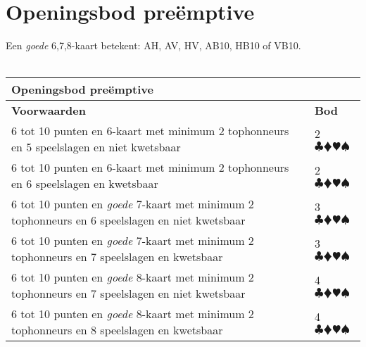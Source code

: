 \documentclass[12pt,a4paper]{report}
\begin{document}
\section{Openingsbod pre\"emptive}

Een \emph{goede} 6,7,8-kaart betekent: AH, AV, HV, AB10, HB10 of VB10.
\\ \  

\begin{tabular}{|p{8cm}|l|}
	\hline 
	\textbf{Openingsbod pre\"emptive} & \\
	\hline 
	\textbf{Voorwaarden}  &\textbf{Bod} \\ 
	\hline 
	
	6 tot 10 punten \newline 
	en 6-kaart met minimum 2 tophonneurs \newline 
	en 5 speelslagen \newline 
	en niet kwetsbaar 
	   & 2  $\clubsuit \vardiamondsuit \varheartsuit \spadesuit$ \\ 
	\hline
	
	6 tot 10 punten \newline 
	en 6-kaart met minimum 2 tophonneurs \newline 
	en 6 speelslagen \newline 
	en  kwetsbaar 
	   & 2  $\clubsuit \vardiamondsuit \varheartsuit \spadesuit$ \\  
	\hline
		
	6 tot 10 punten \newline 
	en \emph{goede} 7-kaart met minimum 2 tophonneurs \newline 
	en 6 speelslagen \newline 
	en  niet kwetsbaar  
	   & 3  $\clubsuit \vardiamondsuit \varheartsuit \spadesuit$ \\  
	\hline 
	
	6 tot 10 punten \newline 
	en \emph{goede} 7-kaart met minimum 2 tophonneurs \newline 
	en 7 speelslagen \newline 
	en kwetsbaar
	   & 3  $\clubsuit \vardiamondsuit \varheartsuit \spadesuit$ \\  
	\hline 	
			
	6 tot 10 punten \newline 
	en \emph{goede} 8-kaart met minimum 2 tophonneurs \newline 
	en 7 speelslagen \newline 
	en  niet kwetsbaar  
	& 4  $\clubsuit \vardiamondsuit \varheartsuit \spadesuit$ \\  
	\hline 
	
	6 tot 10 punten \newline 
	en \emph{goede} 8-kaart met minimum 2 tophonneurs \newline 
	en 8 speelslagen \newline 
	en kwetsbaar
	& 4  $\clubsuit \vardiamondsuit \varheartsuit \spadesuit$  \\  
	\hline 
\end{tabular}
\newpage
\end{document}
